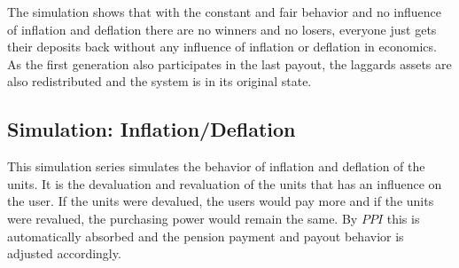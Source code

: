 \begin{table}[hbt!]
\centering
{}
\end{table}

\begin{table}[hbt!]
\centering
{}
\end{table}

The simulation shows that with the constant and fair behavior and no influence of inflation and deflation there are no winners and no losers, everyone just gets their deposits back without any influence of inflation or deflation in economics. As the first generation also participates in the last payout, the laggards assets are also redistributed and the system is in its original state.

\subsection{Simulation: Inflation/Deflation}
This simulation series simulates the behavior of inflation and deflation of the units. It is the devaluation and revaluation of the units that has an influence on the user. If the units were devalued, the users would pay more and if the units were revalued, the purchasing power would remain the same. By $PPI$ this is automatically absorbed and the pension payment and payout behavior is adjusted accordingly. 

